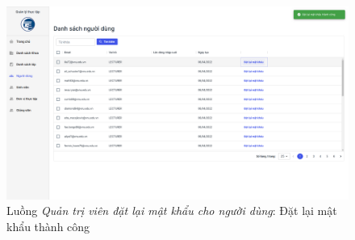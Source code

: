 \documentclass[./../main.tex]{subfiles}
\begin{document}
\begin{figure}[]
	\includegraphics[width=\linewidth]{./images/image70.png}
	\caption{Luồng \emph{Quản trị viên đặt lại mật khẩu cho người dùng}: Đặt lại mật khẩu thành công}
	\label{fig:reset_password_success}
\end{figure}
\end{document}
